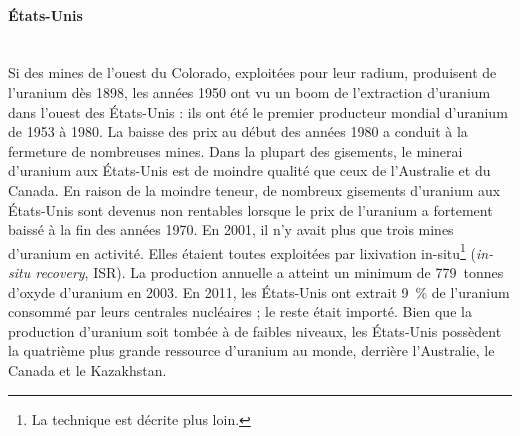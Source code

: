 \documentclass{article}
\begin{document}
\paragraph{États-Unis \\ \\}

Si des mines de l'ouest du Colorado, exploitées pour leur radium, produisent de l'uranium dès 1898, les années 1950 ont vu un boom de l'extraction d'uranium dans l'ouest des États-Unis : ils ont été le premier producteur mondial d'uranium de 1953 à 1980.
La baisse des prix au début des années 1980 a conduit à la fermeture de nombreuses mines. Dans la plupart des gisements, le minerai d'uranium aux États-Unis est de moindre qualité que ceux de l'Australie et du Canada. En raison de la moindre teneur, de nombreux gisements d'uranium aux États-Unis sont devenus non rentables lorsque le prix de l'uranium a fortement baissé à la fin des années 1970. En 2001, il n'y avait plus que trois mines d'uranium en activité. Elles étaient toutes exploitées par lixivation in-situ\footnote{La technique est décrite plus loin.} (\textit{in-situ recovery}, ISR). La production annuelle a atteint un minimum de 779~tonnes d'oxyde d'uranium en 2003.%
En 2011, les États-Unis ont extrait 9~\% de l'uranium consommé par leurs centrales nucléaires ; le reste était importé. Bien que la production d'uranium soit tombée à de faibles niveaux, les États-Unis possèdent la quatrième plus grande ressource d'uranium au monde, derrière l'Australie, le Canada et le Kazakhstan.
\end{document}
